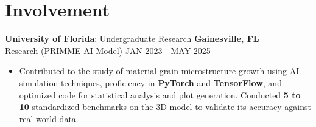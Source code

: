 \documentclass[10pt, letterpaper]{article}
\begin{document}
\section*{Involvement}
\noindent\textbf{University of Florida}: Undergraduate Research \hfill \textbf{Gainesville, FL} \\
Research (PRIMME AI Model) \hfill JAN 2023 - MAY 2025
\begin{itemize}[leftmargin=*, noitemsep, topsep=1pt]
    \item Contributed to the study of material grain microstructure growth using AI simulation techniques, proficiency in \textbf{PyTorch} and \textbf{TensorFlow}, and optimized code for statistical analysis and plot generation. Conducted \textbf{5 to 10} standardized benchmarks on the 3D model to validate its accuracy against real-world data.
\end{itemize}
\end{document}
